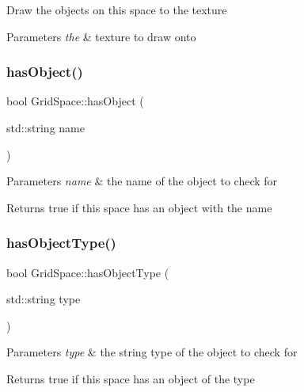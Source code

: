 Draw the objects on this space to the texture


\begin{DoxyParams}{Parameters}
{\em the} & texture to draw onto \\
\hline
\end{DoxyParams}
\mbox{\label{classGridSpace_ace70eaf9c70d0013480543289e5ea6d0}} 
\subsubsection{\texorpdfstring{has\+Object()}{hasObject()}}
{\footnotesize\ttfamily bool Grid\+Space\+::has\+Object (\begin{DoxyParamCaption}\item[{std\+::string}]{name }\end{DoxyParamCaption})}


\begin{DoxyParams}{Parameters}
{\em name} & the name of the object to check for\\
\hline
\end{DoxyParams}
\begin{DoxyReturn}{Returns}
true if this space has an object with the name 
\end{DoxyReturn}
\mbox{\label{classGridSpace_a9721f3981d83c2f9e97635d7ea2c6699}} 
\subsubsection{\texorpdfstring{has\+Object\+Type()}{hasObjectType()}}
{\footnotesize\ttfamily bool Grid\+Space\+::has\+Object\+Type (\begin{DoxyParamCaption}\item[{std\+::string}]{type }\end{DoxyParamCaption})}


\begin{DoxyParams}{Parameters}
{\em type} & the string type of the object to check for\\
\hline
\end{DoxyParams}
\begin{DoxyReturn}{Returns}
true if this space has an object of the type 
\end{DoxyReturn}
\mbox{\label{classGridSpace_a9a1b3e207bbb537340f4a2dd1492796e}} 

